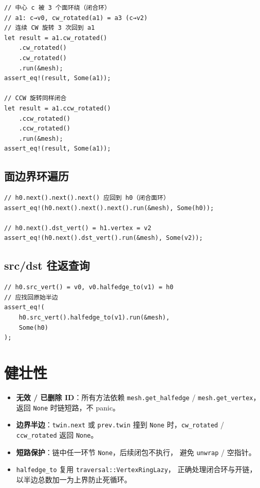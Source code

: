 \documentclass[11pt,a4paper]{article}
\begin{document}
\begin{lstlisting}
// 中心 c 被 3 个面环绕（闭合环）
// a1: c→v0, cw_rotated(a1) = a3 (c→v2)
// 连续 CW 旋转 3 次回到 a1
let result = a1.cw_rotated()
    .cw_rotated()
    .cw_rotated()
    .run(&mesh);
assert_eq!(result, Some(a1));

// CCW 旋转同样闭合
let result = a1.ccw_rotated()
    .ccw_rotated()
    .ccw_rotated()
    .run(&mesh);
assert_eq!(result, Some(a1));
\end{lstlisting}

\subsection{面边界环遍历}

\begin{lstlisting}
// h0.next().next().next() 应回到 h0（闭合面环）
assert_eq!(h0.next().next().next().run(&mesh), Some(h0));

// h0.next().dst_vert() = h1.vertex = v2
assert_eq!(h0.next().dst_vert().run(&mesh), Some(v2));
\end{lstlisting}

\subsection{src/dst 往返查询}

\begin{lstlisting}
// h0.src_vert() = v0, v0.halfedge_to(v1) = h0
// 应找回原始半边
assert_eq!(
    h0.src_vert().halfedge_to(v1).run(&mesh),
    Some(h0)
);
\end{lstlisting}

\section{健壮性}

\begin{itemize}
  \item \textbf{无效 / 已删除 ID}：所有方法依赖 \texttt{mesh.get\_halfedge} /
        \texttt{mesh.get\_vertex}，返回 \texttt{None} 时链短路，不 panic。
  \item \textbf{边界半边}：\texttt{twin.next} 或 \texttt{prev.twin} 撞到
        \texttt{None} 时，\texttt{cw\_rotated} / \texttt{ccw\_rotated} 返回 \texttt{None}。
  \item \textbf{短路保护}：链中任一环节 \texttt{None}，后续闭包不执行，
        避免 \texttt{unwrap} / 空指针。
  \item \texttt{halfedge\_to} 复用 \texttt{traversal::VertexRingLazy}，
        正确处理闭合环与开链，以半边总数加一为上界防止死循环。
\end{itemize}
\end{document}
